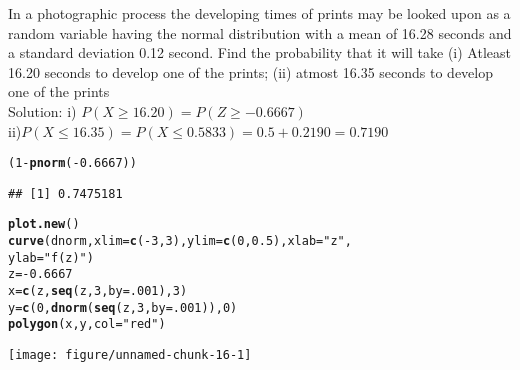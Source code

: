 \documentclass{article}\usepackage[]{graphicx}\usepackage[]{xcolor}
\makeatletter
\def\maxwidth{ %
  \ifdim\Gin@nat@width>\linewidth
    \linewidth
  \else
    \Gin@nat@width
  \fi
}
\newcommand{\hlnum}[1]{\textcolor[rgb]{0.686,0.059,0.569}{#1}}%
\newcommand{\hlsng}[1]{\textcolor[rgb]{0.192,0.494,0.8}{#1}}%
\newcommand{\hlopt}[1]{\textcolor[rgb]{0,0,0}{#1}}%
\newcommand{\hldef}[1]{\textcolor[rgb]{0.345,0.345,0.345}{#1}}%
\newcommand{\hlkwb}[1]{\textcolor[rgb]{0.69,0.353,0.396}{#1}}%
\newcommand{\hlkwc}[1]{\textcolor[rgb]{0.333,0.667,0.333}{#1}}%
\newcommand{\hlkwd}[1]{\textcolor[rgb]{0.737,0.353,0.396}{\textbf{#1}}}%
\newenvironment{kframe}{%
 \def\at@end@of@kframe{}%
 \ifinner\ifhmode%
  \def\at@end@of@kframe{\end{minipage}}%
  \begin{minipage}{\columnwidth}%
 \fi\fi%
 \def\FrameCommand##1{\hskip\@totalleftmargin \hskip-\fboxsep
 \colorbox{shadecolor}{##1}\hskip-\fboxsep
     \hskip-\linewidth \hskip-\@totalleftmargin \hskip\columnwidth}%
 \MakeFramed {\advance\hsize-\width
   \@totalleftmargin\z@ \linewidth\hsize
   \@setminipage}}%
 {\par\unskip\endMakeFramed%
 \at@end@of@kframe}
\newenvironment{knitrout}{}{} %
\makeatother
\begin{document}
In a photographic process the developing times of prints may be looked
upon as a random variable having the normal distribution with a mean of 16.28
seconds and a standard deviation 0.12 second. Find the probability that it will take
(i) Atleast 16.20 seconds to develop one of the prints;
(ii) atmost 16.35 seconds to develop one of the prints  
\\
Solution: i) $P(X\geq 16.20)=P(Z\geq -0.6667) $
\\
ii)$P(X\leq 16.35)=P(X\leq 0.5833)=0.5+0.2190=0.7190 $
\begin{knitrout}
\color{fgcolor}\begin{kframe}
\begin{alltt}
\hldef{(}\hlnum{1}\hlopt{-}\hlkwd{pnorm} \hldef{(}\hlopt{-}\hlnum{0.6667}\hldef{))}
\end{alltt}
\begin{verbatim}
## [1] 0.7475181
\end{verbatim}
\begin{alltt}
\hlkwd{plot.new}\hldef{()}
\hlkwd{curve} \hldef{(dnorm,} \hlkwc{xlim} \hldef{=} \hlkwd{c}\hldef{(}\hlopt{-}\hlnum{3}\hldef{,} \hlnum{3}\hldef{),} \hlkwc{ylim} \hldef{=} \hlkwd{c}\hldef{(}\hlnum{0}\hldef{,} \hlnum{0.5}\hldef{),} \hlkwc{xlab} \hldef{=} \hlsng{"z"}\hldef{,}
       \hlkwc{ylab}\hldef{=}\hlsng{"f(z)"}\hldef{)}
\hldef{z} \hlkwb{=} \hlopt{-}\hlnum{0.6667}
\hldef{x} \hlkwb{=} \hlkwd{c}\hldef{(z,} \hlkwd{seq}\hldef{(z,} \hlnum{3}\hldef{,} \hlkwc{by}\hldef{=}\hlnum{.001}\hldef{),} \hlnum{3}\hldef{)}
\hldef{y} \hlkwb{=} \hlkwd{c}\hldef{(}\hlnum{0}\hldef{,} \hlkwd{dnorm}\hldef{(}\hlkwd{seq}\hldef{(z,} \hlnum{3}\hldef{,} \hlkwc{by}\hldef{=}\hlnum{.001}\hldef{)),} \hlnum{0}\hldef{)}
\hlkwd{polygon}\hldef{(x, y,} \hlkwc{col}\hldef{=}\hlsng{"red"}\hldef{)}
\end{alltt}
\end{kframe}
\texttt{[image: figure/unnamed-chunk-16-1]} 
\end{knitrout}
\end{document}
